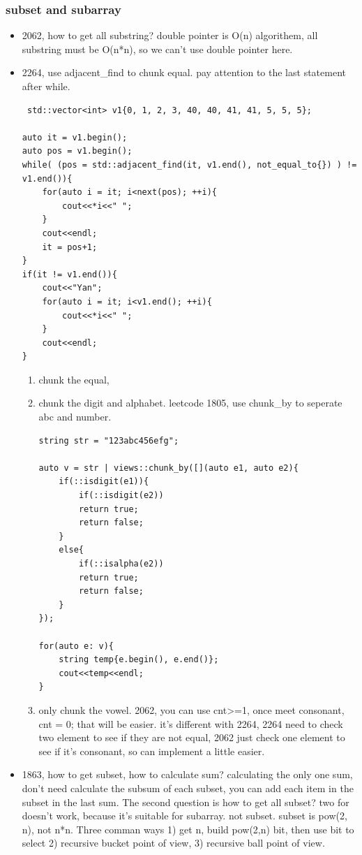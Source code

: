 \documentclass[a4paper,11pt,twoside]{book}
\begin{document}
\subsubsection{subset and subarray}
\begin{itemize}
	\item 2062, how to get all substring? double pointer is O(n) algorithem, all substring must be O(n*n), so we can't use double pointer here. 
	
	
	\item 2264, use adjacent\_find to chunk equal. pay attention to the last statement after while. 
\begin{lstlisting}
 std::vector<int> v1{0, 1, 2, 3, 40, 40, 41, 41, 5, 5, 5};

auto it = v1.begin();
auto pos = v1.begin();
while( (pos = std::adjacent_find(it, v1.end(), not_equal_to{}) ) != v1.end()){
	for(auto i = it; i<next(pos); ++i){
		cout<<*i<<" ";
	}
	cout<<endl;
	it = pos+1;
}
if(it != v1.end()){
	cout<<"Yan";
	for(auto i = it; i<v1.end(); ++i){
		cout<<*i<<" ";
	}
	cout<<endl;
}
\end{lstlisting}
	\begin{enumerate}
		\item chunk the equal, 
		\item chunk the digit and alphabet. 	leetcode 1805, use chunk\_by to seperate abc and number.
		
\begin{lstlisting}
string str = "123abc456efg";

auto v = str | views::chunk_by([](auto e1, auto e2){
	if(::isdigit(e1)){
		if(::isdigit(e2))
		return true;
		return false;     
	}
	else{
		if(::isalpha(e2))
		return true;
		return false;     
	}
});

for(auto e: v){
	string temp{e.begin(), e.end()};
	cout<<temp<<endl;
}
\end{lstlisting}
		

		\item only chunk the vowel. 2062, you can use cnt>=1, once meet consonant, cnt = 0; that will be easier. it's different with 2264, 2264 need to check two element to see if they are not equal, 2062 just check one element to see if it's consonant, so can implement a little easier. 
	\end{enumerate}
	
	\item 1863, how to get subset, how to calculate sum? calculating the only one sum, don't need calculate the subsum of each subset, you can add each item in the subset in the last sum. The second question is how to get all subset? two for doesn't work, because it's suitable for subarray. not subset. subset is pow(2, n), not n*n. Three comman ways 1) get n, build pow(2,n) bit, then use bit to select 2) recursive bucket point of view, 3) recursive ball point of view. 
	

\end{itemize}
\end{document}

